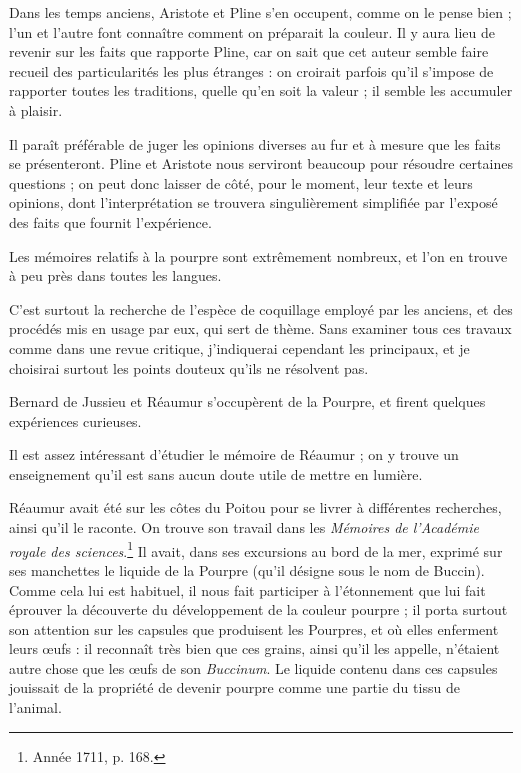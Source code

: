 \documentclass[a4paper, 11pt, oneside, polutonikogreek, french]{article}
\begin{document}
Dans les temps anciens, Aristote et Pline s'en occupent, comme on le pense bien ; l'un et l'autre font connaître comment on préparait la couleur. Il y aura lieu de revenir sur les faits que rapporte Pline, car on sait que cet auteur semble faire recueil des particularités les plus étranges : on croirait parfois qu'il s'impose de rapporter toutes les traditions, quelle qu'en soit la valeur ; il semble les accumuler à plaisir.

Il paraît préférable de juger les opinions diverses au fur et à mesure que les faits se présenteront. Pline et Aristote nous serviront beaucoup pour résoudre certaines questions ; on peut donc laisser de côté, pour le moment, leur texte et leurs opinions, dont l'interprétation se trouvera singulièrement simplifiée par l'exposé des faits que fournit l'expérience.

Les mémoires relatifs à la pourpre sont extrêmement nombreux, et l'on en trouve à peu près dans toutes les langues.

C'est surtout la recherche de l'espèce de coquillage employé par les anciens, et des procédés mis en usage par eux, qui sert de thème. Sans examiner tous ces travaux comme dans une revue critique, j'indiquerai cependant les principaux, et je choisirai surtout les points douteux qu'ils ne résolvent pas.

Bernard de Jussieu et Réaumur s'occupèrent de la Pourpre, et firent quelques expériences curieuses.

Il est assez intéressant d'étudier le mémoire de Réaumur ; on y trouve un enseignement qu'il est sans aucun doute utile de mettre en lumière.

Réaumur avait été sur les côtes du Poitou pour se livrer à différentes recherches, ainsi qu'il le raconte. On trouve son travail dans les \emph{Mémoires de l'Académie royale des sciences}.\footnote{Année 1711, p. 168.} Il avait, dans ses excursions au bord de la mer, exprimé sur ses manchettes le liquide de la Pourpre (qu'il désigne sous le nom de Buccin). Comme cela lui est habituel, il nous fait participer à l'étonnement que lui fait éprouver la découverte du développement de la couleur pourpre ; il porta surtout son attention sur les capsules que produisent les Pourpres, et où elles enferment leurs œufs : il reconnaît très bien que ces grains, ainsi qu'il les appelle, n'étaient autre chose que les œufs de son \emph{Buccinum}. Le liquide contenu dans ces capsules jouissait de la propriété de devenir pourpre comme une partie du tissu de l'animal.
\end{document}
